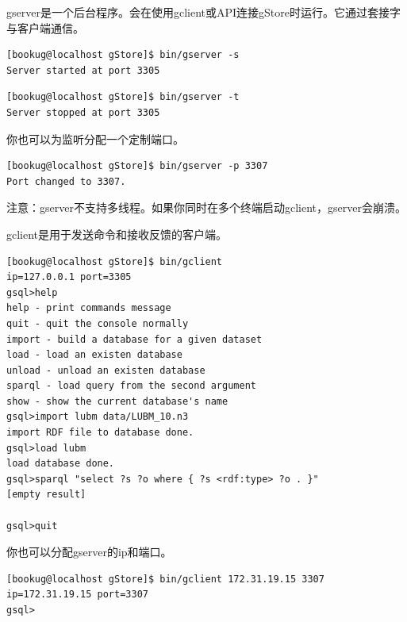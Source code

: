 \documentclass[titlepage, a4paper, 12pt]{article}
\begin{document}

gserver是一个后台程序。会在使用gclient或API连接gStore时运行。它通过套接字与客户端通信。

\begin{verbatim}
[bookug@localhost gStore]$ bin/gserver -s
Server started at port 3305
\end{verbatim}

\begin{verbatim}
[bookug@localhost gStore]$ bin/gserver -t
Server stopped at port 3305
\end{verbatim}

你也可以为监听分配一个定制端口。

\begin{verbatim}
[bookug@localhost gStore]$ bin/gserver -p 3307
Port changed to 3307.
\end{verbatim}

注意：gserver不支持多线程。如果你同时在多个终端启动gclient，gserver会崩溃。


gclient是用于发送命令和接收反馈的客户端。

\begin{verbatim}
[bookug@localhost gStore]$ bin/gclient
ip=127.0.0.1 port=3305
gsql>help
help - print commands message
quit - quit the console normally
import - build a database for a given dataset
load - load an existen database
unload - unload an existen database
sparql - load query from the second argument
show - show the current database's name
gsql>import lubm data/LUBM_10.n3
import RDF file to database done.
gsql>load lubm
load database done.
gsql>sparql "select ?s ?o where { ?s <rdf:type> ?o . }"
[empty result]

gsql>quit
\end{verbatim}

你也可以分配gserver的ip和端口。

\begin{verbatim}
[bookug@localhost gStore]$ bin/gclient 172.31.19.15 3307
ip=172.31.19.15 port=3307
gsql>
\end{verbatim}
\end{document}
